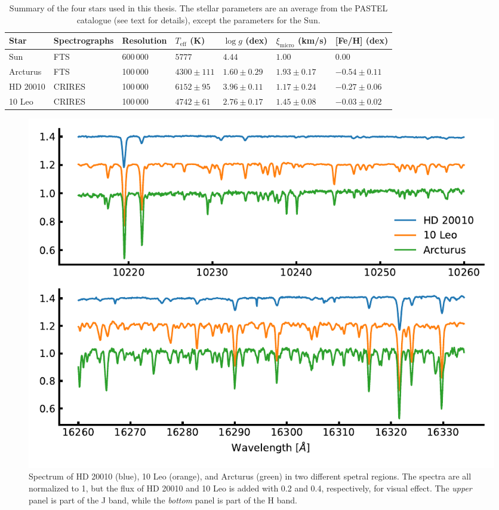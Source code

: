 \begin{table}[htb!]
    \caption{Summary of the four stars used in this thesis. The stellar parameters are an average
             from the PASTEL catalogue \citep{Soubiran2016} (see text for details), except the
             parameters for the Sun.}
    \label{tab:stars}
    \centering
    \begin{tabular}{lllllll}
      \hline\hline
        Star        & Spectrographs  & Resolution  & $T_\mathrm{eff}$ (K) &  $\log g$ (dex)  &   $\xi_\mathrm{micro}$ (km/s)   & [Fe/H] (dex)      \\
      \hline
        Sun         & FTS            & 600\,000    & $5777$               &  $4.44$          &    $1.00$                       & $ 0.00$          \\
        Arcturus    & FTS            & 100\,000    & $4300 \pm 111$       &  $1.60 \pm 0.29$ &    $1.93 \pm 0.17$              & $-0.54 \pm 0.11$ \\
        HD 20010    & CRIRES         & 100\,000    & $6152 \pm  95$       &  $3.96 \pm 0.11$ &    $1.17 \pm 0.24$              & $-0.27 \pm 0.06$ \\
        10 Leo      & CRIRES         & 100\,000    & $4742 \pm  61$       &  $2.76 \pm 0.17$ &    $1.45 \pm 0.08$              & $-0.03 \pm 0.02$ \\
      \hline
    \end{tabular}
\end{table}

\begin{figure}[htpb!]
    \centering
    \includegraphics[width=1.0\linewidth]{figures/NIRspectra.pdf}
    \caption{Spectrum of HD 20010 (blue), 10 Leo (orange), and Arcturus (green) in two different
             spetral regions. The spectra are all normalized to 1, but the flux of HD 20010 and 10
             Leo is added with 0.2 and 0.4, respectively, for visual effect. The \emph{upper} panel
             is part of the J band, while the \emph{bottom} panel is part of the H band.}
    \label{fig:NIRspectra}
\end{figure}


